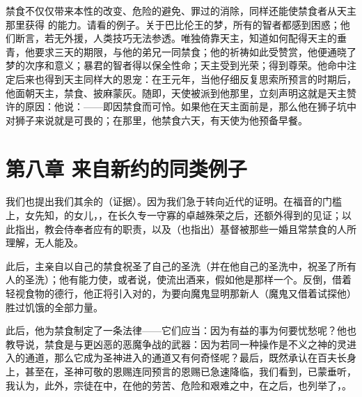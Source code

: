 禁食不仅仅带来本性的改变、危险的避免、罪过的消除，同样还能使禁食者从天主那里获得  的能力。请看的例子。关于巴比伦王的梦，所有的智者都感到困惑；他们断言，若无外援，人类技巧无法参透。唯独倚靠天主，知道如何配得天主的垂青，他要求三天的期限，与他的弟兄一同禁食；他的祈祷如此受赞赏，他便通晓了梦的次序和意义；暴君的智者得以保全性命；天主受到光荣；得到尊荣。他命中注定后来也得到天主同样大的恩宠：在王元年，当他仔细反复思索所预言的时期后，他面朝天主，禁食、披麻蒙灰。随即，天使被派到他那里，立刻声明这就是天主赞许的原因：他说：——即因禁食而可怜。如果他在天主面前是，那么他在狮子坑中对狮子来说就是可畏的；在那里，他禁食六天，有天使为他预备早餐。\par


\section{第八章 来自新约的同类例子}

我们也提出我们其余的（证据）。因为我们急于转向近代的证明。在福音的门槛上，女先知，的女儿，，在长久专一守寡的卓越殊荣之后，还额外得到的见证；以此指出，教会侍奉者应有的职责，以及（也指出）基督被那些一婚且常禁食的人所理解，无人能及。\par

此后，主亲自以自己的禁食祝圣了自己的圣洗（并在他自己的圣洗中，祝圣了所有人的圣洗）；他有能力使，或者说，使流出酒来，假如他是那样一个。反倒，借着轻视食物的德行，他正将引入对的，为要向魔鬼显明那新人（魔鬼又借着试探他）胜过饥饿的全部力量。\par

此后，他为禁食制定了一条法律——它们应当：因为有益的事为何要忧愁呢？他也教导说，禁食是与更凶恶的恶魔争战的武器：因为若同一种操作是不义之神的灵进入的通道，那么它成为圣神进入的通道又有何奇怪呢？最后，既然承认在百夫长身上，甚至在，圣神可敬的恩赐连同预言的恩赐已急速降临，我们看到，已蒙垂听，我认为，此外，宗徒在中，在他的劳苦、危险和艰难之中，在之后，也列举了，。\par

